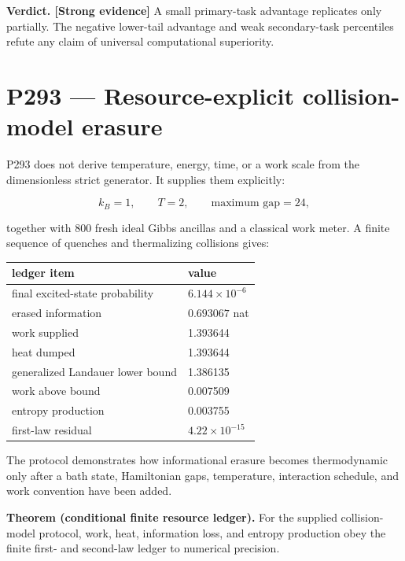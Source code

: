 \documentclass[11pt,a4paper,openany]{report}
\newcommand{\statusStrong}{\textcolor{finblue}{[Strong evidence]}}
\begin{document}
\textbf{Verdict. \statusStrong{}} A small primary-task advantage replicates only partially. The negative lower-tail advantage and weak secondary-task percentiles refute any claim of universal computational superiority.

\chapter{P293 --- Resource-explicit collision-model erasure}

P293 does not derive temperature, energy, time, or a work scale from the dimensionless strict generator. It supplies them explicitly:

\[
k_B=1,\qquad T=2,\qquad
\text{maximum gap}=24,
\]

together with 800 fresh ideal Gibbs ancillas and a classical work meter. A finite sequence of quenches and thermalizing collisions gives:

\begin{center}
\begingroup\small
\setlength{\tabcolsep}{2.5pt}
\renewcommand{\arraystretch}{1.16}
\begin{longtable}{@{}p{}p{}@{}}
\toprule
\textbf{ledger item} & \textbf{value} \\
\midrule
\endhead
final excited-state probability & \(6.144\times10^{-6}\) \\
erased information & \(0.693067\) nat \\
work supplied & 1.393644 \\
heat dumped & 1.393644 \\
generalized Landauer lower bound & 1.386135 \\
work above bound & 0.007509 \\
entropy production & 0.003755 \\
first-law residual & \(4.22\times10^{-15}\) \\
\bottomrule
\end{longtable}
\endgroup
\end{center}

The protocol demonstrates how informational erasure becomes thermodynamic only after a bath state, Hamiltonian gaps, temperature, interaction schedule, and work convention have been added.

\textbf{Theorem (conditional finite resource ledger).} For the supplied collision-model protocol, work, heat, information loss, and entropy production obey the finite first- and second-law ledger to numerical precision.
\end{document}

